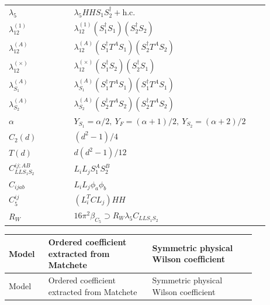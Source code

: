 \documentclass[8pt]{article}
\begin{document}
\begin{landscape}
\begin{longtable}{@{}p{0.23\linewidth}p{0.69\linewidth}@{}}
$\lambda_5$ & $\lambda_5HHS_1S_2^\dagger+\mathrm{h.c.}$ \\
$\lambda_{12}^{(1)}$ & $\lambda_{12}^{(1)}(S_1^\dagger S_1)(S_2^\dagger S_2)$ \\
$\lambda_{12}^{(A)}$ & $\lambda_{12}^{(A)}(S_1^\dagger T^AS_1)(S_2^\dagger T^AS_2)$ \\
$\lambda_{12}^{(\times)}$ & $\lambda_{12}^{(\times)}(S_1^\dagger S_2)(S_2^\dagger S_1)$ \\
$\lambda_{S_1}^{(A)}$ & $\lambda_{S_1}^{(A)}(S_1^\dagger T^A S_1)(S_1^\dagger T^A S_1)$ \\
$\lambda_{S_2}^{(A)}$ & $\lambda_{S_2}^{(A)}(S_2^\dagger T^A S_2)(S_2^\dagger T^A S_2)$ \\
$\alpha$ & $Y_{S_1}=\alpha/2,\ Y_F=(\alpha+1)/2,\ Y_{S_2}=(\alpha+2)/2$ \\
$C_2(d)$ & $(d^2-1)/4$ \\
$T(d)$ & $d(d^2-1)/12$ \\
$C_{LLS_1S_2}^{ij;AB}$ & $L_iL_jS_1^AS_2^B$ \\
$C_{ijab}$ & $L_iL_j\phi_a\phi_b$ \\
$C_5^{ij}$ & $(L_i^TCL_j)HH$ \\
$R_W$ & $16\pi^2\beta_{C_5}\supset R_W\lambda_5C_{LLS_1S_2}$ \\
\bottomrule
\end{longtable}
\scriptsize
\begin{longtable}{@{}l >{\raggedright\arraybackslash}p{0.42\linewidth} >{\raggedright\arraybackslash}p{0.42\linewidth}@{}}
\toprule
Model & Ordered coefficient extracted from Matchete & Symmetric physical Wilson coefficient \\
\midrule
\endfirsthead
\toprule
Model & Ordered coefficient extracted from Matchete & Symmetric physical Wilson coefficient \\
\midrule
\endhead

\end{longtable}
\end{landscape}
\end{document}
